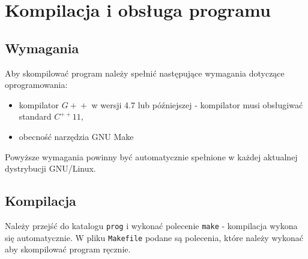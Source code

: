 \documentclass[a4paper,11pt]{article}
\begin{document}
  \section{Kompilacja i obsługa programu}
    \subsection{Wymagania}
    Aby skompilować program należy spełnić następujące wymagania dotyczące oprogramowania:
    \begin{itemize}
      \item kompilator $ G\!+\!+ $ w wersji 4.7 lub późniejszej - kompilator musi obsługiwać standard $ C^{++}11 $,
      \item obecność narzędzia GNU Make
    \end{itemize}
    Powyższe wymagania powinny być automatycznie spełnione w każdej aktualnej dystrybucji GNU/Linux.
    
    \subsection{Kompilacja}
    Należy przejść do katalogu \texttt{prog} i wykonać polecenie \texttt{make} - kompilacja wykona się automatycznie. W pliku \texttt{Makefile} podane są polecenia, które należy wykonać aby skompilować program ręcznie.
    
\end{document}
